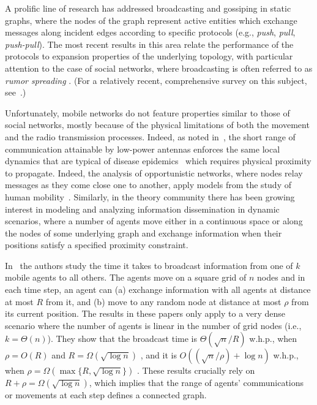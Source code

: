 \documentclass[11pt]{article}
\newcommand{\bigO}[1]{O\left(#1\right)}
\newcommand{\bigTh}[1]{\Theta\left(#1\right)}
\newcommand{\bigOm}[1]{\Omega\left(#1\right)}
\begin{document}
A prolific line of research has addressed broadcasting and gossiping
in static graphs, where the nodes of the graph represent active
entities which exchange messages along incident edges according to
specific protocols (e.g., \emph{push}, \emph{pull}, \emph{push-pull}).
The most recent results in this area relate the performance of the
protocols to expansion properties of the underlying topology, with
particular attention to the case of social networks, where
broadcasting is often referred to as \emph{rumor spreading}
\cite{ChierichettiLP10}.  (For a relatively recent, comprehensive
survey on this subject, see~\cite{HromkovicKPRU05}.)

Unfortunately, mobile networks do not feature
properties similar to those of social networks,
mostly because of the physical limitations
of both the movement and the radio transmission processes.
Indeed, as noted in~\cite{Kleinberg07},
the short range of communication attainable
by low-power antennas enforces the same local dynamics
that are typical of disease epidemics~\cite{Durrett99}
which requires physical proximity to propagate.
Indeed, the analysis of opportunistic networks,
where nodes relay messages as they come
close one to another, apply models 
from the study of human mobility~\cite{ChaintreauHCDGS07, Chaintreau08}.
Similarly, in the theory community there has been growing
interest in modeling and analyzing information dissemination in dynamic scenarios,
where a number of agents move either in a continuous space or along
the nodes of some underlying graph and exchange information when their
positions satisfy a specified proximity constraint.

In~\cite{ClementiMPS09,ClementiPS09} the authors study the time it takes
to broadcast information from one of $k$ mobile agents to all others.
The agents move on a square grid of $n$ nodes and in each time step,
an agent can (a) exchange information with all agents at distance at
most $R$ from it, and (b) move to any random node at distance at most
$\rho$ from its current position. The results in these papers only
apply to a very dense scenario where the number of agents is linear in
the number of grid nodes (i.e., $k=\bigTh{n}$).  They show that the
broadcast time is $\bigTh{\sqrt{n}/R}$ w.h.p., when $\rho = \bigO{R}$
and $R = \bigOm{\sqrt{\log n}}$ \cite{ClementiMPS09}, and it is
$\bigO{(\sqrt{n}/\rho)+\log n}$ w.h.p., when $\rho =
\bigOm{\max\{R,\sqrt{\log n}\}}$ \cite{ClementiPS09}.  These results
crucially rely on $R+\rho = \bigOm{\sqrt{\log n}}$, which implies that
the range of agents' communications or movements at each step defines
a connected graph.
\end{document}
